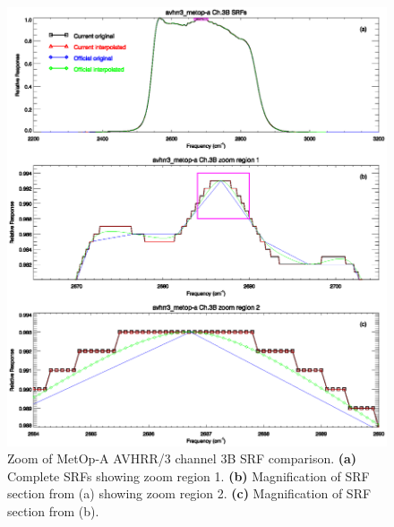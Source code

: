 \begin{figure}[htp]
  \centering
  \includegraphics[scale=1]{graphics/zoom/avhrr3_metop-a.ch3.srf.zoom.eps}
  \caption{Zoom of MetOp-A AVHRR/3 channel 3B SRF comparison. \textbf{(a)} Complete SRFs showing zoom region 1. \textbf{(b)} Magnification of SRF section from (a) showing zoom region 2.  \textbf{(c)} Magnification of SRF section from (b).}
  \label{fig:avhrr3_metop-a.ch3.srf.zoom}
\end{figure}

